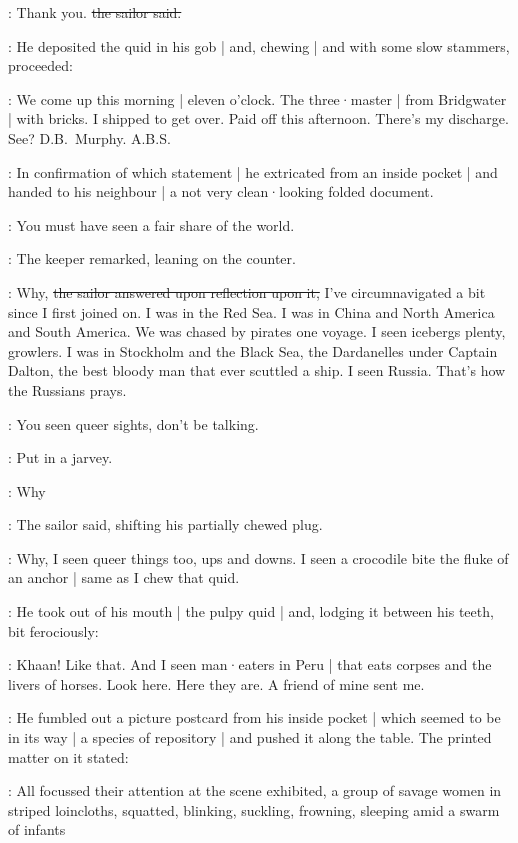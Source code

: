 \Murphy:
Thank you.
\sout{the sailor said.}

:
He deposited the quid in his gob |
and,
chewing |
and with some slow stammers,
proceeded:

\Murphy:
We come up this morning |
eleven o'clock.
The three·master  |
from Bridgwater |
with bricks.
I shipped to get over.
Paid off this afternoon.
There's my discharge.
See?
D.B.~Murphy.
A.B.S.

:
In confirmation of which statement |
he extricated from an inside pocket |
and handed to his neighbour |
a not very clean·looking folded document.

\SkinTheGoat:
You must have seen a fair share of the world.

:
The keeper remarked,
leaning on the counter.

\Murphy:
Why,
\sout{the sailor answered upon reflection upon it,}
I've circumnavigated a bit since I first joined on.
I was in the Red Sea.
I was in China and North America and South America.
We was chased by pirates one voyage.
I seen icebergs plenty,
growlers.
I was in Stockholm and the Black Sea,
the Dardanelles under Captain Dalton,
the best bloody man that ever scuttled a ship.
I seen Russia.
That's how the Russians prays.

\Campbell:
You seen queer sights,
don't be talking.

:
Put in a jarvey.

\Murphy:
Why

:
The sailor said,
shifting his partially chewed plug.

\Murphy:
Why,
I seen queer things too,
ups and downs.
I seen a crocodile bite the fluke of an anchor |
same as I chew that quid.

:
He took out of his mouth |
the pulpy quid |
and,
lodging it between his teeth,
bit ferociously:

\Murphy:
Khaan!
Like that.
And I seen man·eaters in Peru |
that eats corpses and the livers of horses.
Look here.
Here they are.
A friend of mine sent me.

:
He fumbled out a picture postcard from his inside pocket |
which seemed to be in its way |
a species of repository |
and pushed it along the table.
The printed matter on it stated:

:
All focussed their attention at the scene exhibited,
a group of savage women in striped loincloths,
squatted,
blinking,
suckling,
frowning,
sleeping amid a swarm of infants

